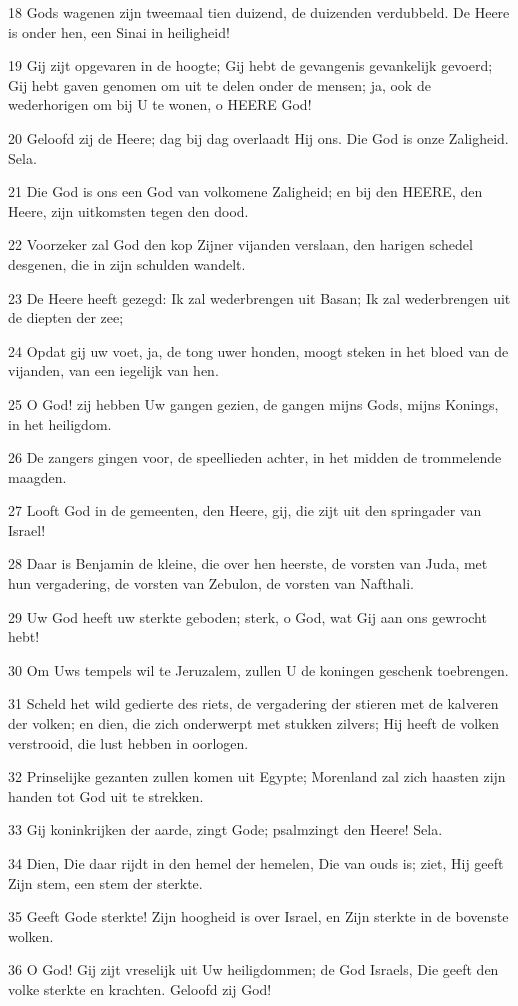 \par 18 Gods wagenen zijn tweemaal tien duizend, de duizenden verdubbeld. De Heere is onder hen, een Sinai in heiligheid!
\par 19 Gij zijt opgevaren in de hoogte; Gij hebt de gevangenis gevankelijk gevoerd; Gij hebt gaven genomen om uit te delen onder de mensen; ja, ook de wederhorigen om bij U te wonen, o HEERE God!
\par 20 Geloofd zij de Heere; dag bij dag overlaadt Hij ons. Die God is onze Zaligheid. Sela.
\par 21 Die God is ons een God van volkomene Zaligheid; en bij den HEERE, den Heere, zijn uitkomsten tegen den dood.
\par 22 Voorzeker zal God den kop Zijner vijanden verslaan, den harigen schedel desgenen, die in zijn schulden wandelt.
\par 23 De Heere heeft gezegd: Ik zal wederbrengen uit Basan; Ik zal wederbrengen uit de diepten der zee;
\par 24 Opdat gij uw voet, ja, de tong uwer honden, moogt steken in het bloed van de vijanden, van een iegelijk van hen.
\par 25 O God! zij hebben Uw gangen gezien, de gangen mijns Gods, mijns Konings, in het heiligdom.
\par 26 De zangers gingen voor, de speellieden achter, in het midden de trommelende maagden.
\par 27 Looft God in de gemeenten, den Heere, gij, die zijt uit den springader van Israel!
\par 28 Daar is Benjamin de kleine, die over hen heerste, de vorsten van Juda, met hun vergadering, de vorsten van Zebulon, de vorsten van Nafthali.
\par 29 Uw God heeft uw sterkte geboden; sterk, o God, wat Gij aan ons gewrocht hebt!
\par 30 Om Uws tempels wil te Jeruzalem, zullen U de koningen geschenk toebrengen.
\par 31 Scheld het wild gedierte des riets, de vergadering der stieren met de kalveren der volken; en dien, die zich onderwerpt met stukken zilvers; Hij heeft de volken verstrooid, die lust hebben in oorlogen.
\par 32 Prinselijke gezanten zullen komen uit Egypte; Morenland zal zich haasten zijn handen tot God uit te strekken.
\par 33 Gij koninkrijken der aarde, zingt Gode; psalmzingt den Heere! Sela.
\par 34 Dien, Die daar rijdt in den hemel der hemelen, Die van ouds is; ziet, Hij geeft Zijn stem, een stem der sterkte.
\par 35 Geeft Gode sterkte! Zijn hoogheid is over Israel, en Zijn sterkte in de bovenste wolken.
\par 36 O God! Gij zijt vreselijk uit Uw heiligdommen; de God Israels, Die geeft den volke sterkte en krachten. Geloofd zij God!

